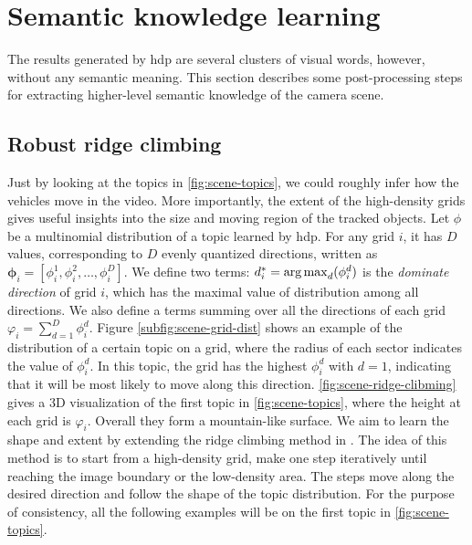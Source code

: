 \section{Semantic knowledge learning}
\label{sec:scene-ridge-climbing}
The results generated by \gls{hdp} are several clusters of visual words, however, without any semantic meaning.
This section describes some post-processing steps for extracting higher-level semantic knowledge of the camera scene.

\subsection{Robust ridge climbing}
    Just by looking at the topics in \ref{fig:scene-topics}, we could roughly infer how the vehicles move in the video. 
    More importantly, the extent of the high-density grids gives useful insights into the size and moving region of the tracked objects. 
    Let $\phi$ be a multinomial distribution of a topic learned by \gls{hdp}. For any grid $i$, it has $D$ values, corresponding to $D$ evenly quantized directions, written as $\bm{\phi}_i= [\phi_i^{1}, \phi_i^{2}, \dots, \phi_i^{D}]$.
    We define two terms:
    $d^*_i = \operatorname*{arg\,max}_{d}(\phi_i^{d})$ is the \emph{dominate direction} of grid $i$, which has the maximal value of distribution among all directions.
    We also define a terms summing over all the directions of each grid $\varphi_{i} = \sum_{d=1}^{D}{\phi_i^{d}}$.
    Figure \ref{subfig:scene-grid-dist} shows an example of the distribution of a certain topic on a grid, where the radius of each sector indicates the value of $\phi_i^{d}$. 
    In this topic, the grid has the highest $\phi_i^d$ with $d=1$, indicating that it will be most likely to move along this direction. 
    \ref{fig:scene-ridge-clibming} gives a 3D visualization of the first topic in \ref{fig:scene-topics}, where the height at each grid is $\varphi_{i}$. 
    Overall they form a mountain-like surface. We aim to learn the shape and extent by extending the ridge climbing method in \cite{zhao2013counting}. 
    The idea of this method is to start from a high-density grid, make one step iteratively until reaching the image boundary or the low-density area. 
    The steps move along the desired direction and follow the shape of the topic distribution. 
    For the purpose of consistency, all the following examples will be on the first topic in \ref{fig:scene-topics}.
    
    

